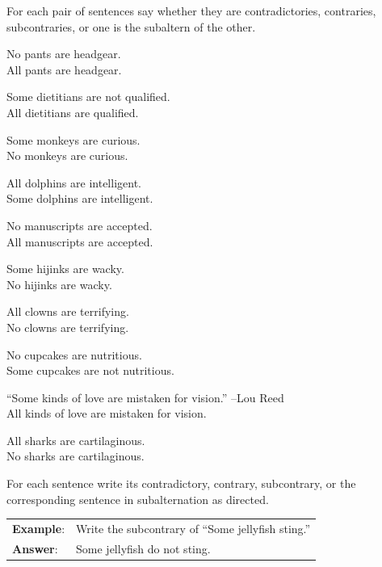 \noindent \problempart For each pair of sentences say whether they are contradictories, contraries, subcontraries, or one is the subaltern of the other. 

\begin{exercises}
\item No pants are headgear. \\
	All pants are headgear.  
\item Some dietitians are not qualified. \\
	All dietitians are qualified.  
\item Some monkeys are curious. \\ 
	No monkeys are curious.  
\item All dolphins are intelligent. \\
	Some dolphins are intelligent.  
\item No manuscripts are accepted. \\
	All manuscripts are accepted. 
\item Some hijinks are wacky. \\ 
	No hijinks are wacky. 
\item All clowns are terrifying. \\
	No clowns are terrifying.  
\item No cupcakes are nutritious. \\
	Some cupcakes are not nutritious. 
\item ``Some kinds of love are mistaken for vision.'' --Lou Reed \\
	All kinds of love are mistaken for vision. 
\item All sharks are cartilaginous. \\
	No sharks are cartilaginous.
\end{exercises}

\noindent \problempart For each sentence write its contradictory, contrary, subcontrary, or the corresponding sentence in subalternation as directed.

\begin{longtabu}{p{.1\linewidth}p{.9\linewidth}}
\textbf{Example}: & Write the subcontrary of ``Some jellyfish sting.''\\
\textbf{Answer}: & Some jellyfish do not sting.\\
\end{longtabu}


